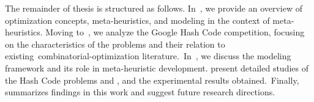 The remainder of thesis is structured as follows. In~, we
provide an overview of optimization concepts, meta-heuristics, and modeling in
the context of meta-heuristics. Moving to~, we
analyze the Google Hash Code competition, focusing on the characteristics of the
problems and their relation to existing~\acrshort{combinatorial-optimization}
literature.~In~, we discuss the modeling
framework and its role in meta-heuristic development.
 present detailed studies of the
Hash Code problems  and , and the experimental results obtained.~Finally,~
summarizes findings in this work and suggest future research directions.